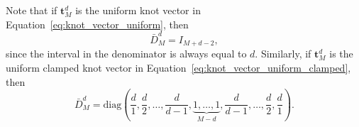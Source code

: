 Note that if $\mathbf{t}_M^d$ is the uniform knot vector in Equation~\eqref{eq:knot_vector_uniform}, then 
\[
\bar{D}_M^d  = I_{M+d-2},
\]
since the interval in the denominator is always equal to $d$.
%
Similarly, if $\mathbf{t}_M^d$ is the uniform clamped knot vector in Equation~\eqref{eq:knot_vector_uniform_clamped}, then 
\[
\bar{D}_M^d = \text{diag}\left(\frac{d}{1}, \frac{d}{2}, \dots, \frac{d}{d-1}, \underbrace{1, \dots, 1}_{M-d}, \frac{d}{d-1}, \dots, \frac{d}{2}, \frac{d}{1}\right).
\]

%


